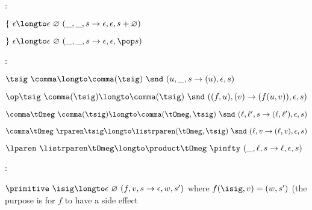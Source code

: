 :
\blist
    \item $\lbrace\ \epsilon \longto \epsilon\ \varnothing\ (\_,\_,s\to\epsilon,\epsilon,s+\varnothing)$
    \item $\rbrace\ \epsilon \longto \epsilon\ \varnothing\ (\_,\_,s\to\epsilon,\epsilon,\pop s)$
\elist

:
\blist
    \item $\tsig\ \comma \longto \comma(\tsig)\ \snd\ (u,\_,s\to(u),\epsilon,s)$
    \item $\op\tsig\ \comma(\tsig) \longto \comma(\tsig)\ \snd\ ((f,u),(v)\to (f(u,v)),\epsilon,s)$
    \item $\comma\tOmeg\ \comma(\tsig) \longto \comma(\tOmeg,\tsig)\ \snd\ (\ell,\ell',s\to(\ell,\ell'),\epsilon,s)$
    \item $\comma\tOmeg\ \rparen\tsig \longto \listrparen(\tOmeg,\tsig)\ \snd\ (\ell,v\to (\ell,v),\epsilon,s)$
    \item $\lparen\ \listrparen\tOmeg \longto \product\tOmeg\ \pinfty\ (\_,\ell,s\to \ell,\epsilon,s)$
\elist

:
\blist
    \item $\primitive\ \isig \longto \epsilon\ \varnothing\ (f,v,s\to \epsilon,w,s')$ where $f(\isig,v)=(w,s')$ (the purpose is for $f$ to have a side effect
\elist

\bye

